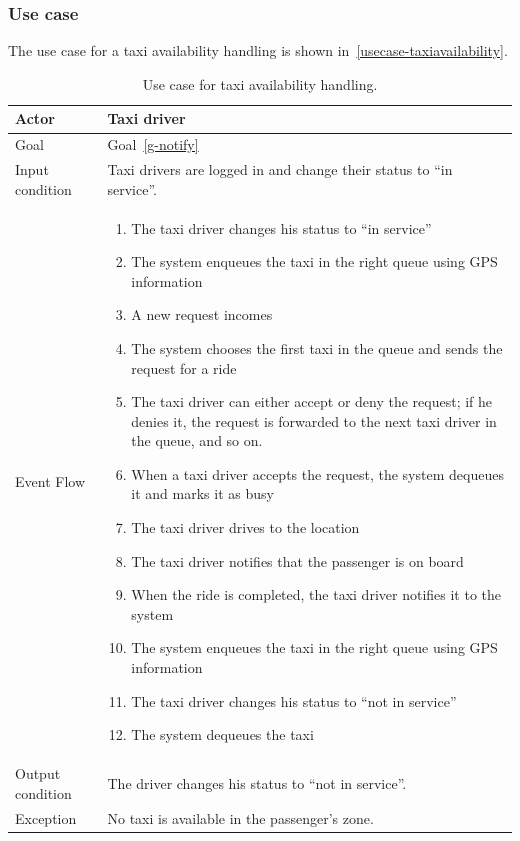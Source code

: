 \subsubsection{Use case}
The use case for a taxi availability handling is shown in~\autoref{usecase-taxiavailability}.

\begin{table}
\begin{center}
\begin{tabular}{| l | p{} |}
\hline
Actor & Taxi driver \\
\hline
Goal & Goal~\ref{g-notify}
\\
\hline
Input condition & Taxi drivers are logged in and change their status to ``in service''.  \\
\hline
Event Flow & \begin{enumerate}
	\item The taxi driver changes his status to ``in service''
	\item The system enqueues the taxi in the right queue using GPS information
	\item A new request incomes
	\item The system chooses the first taxi in the queue and sends the request for a ride
	\item The taxi driver can either accept or deny the request; if he denies it, the request is forwarded to the next taxi driver in the queue, and so on.
	\item When a taxi driver accepts the request, the system dequeues it and marks it as busy
	\item The taxi driver drives to the location
	\item The taxi driver notifies that the passenger is on board
	\item When the ride is completed, the taxi driver notifies it to the system
	\item The system enqueues the taxi in the right queue using GPS information
	\item The taxi driver changes his status to ``not in service''
	\item The system dequeues the taxi
\end{enumerate}
\\
\hline
Output condition & The driver changes his status to ``not in service''. \\
\hline
Exception & No taxi is available in the passenger's zone. \\
\hline
\end{tabular}
\end{center}
\caption{Use case for taxi availability handling.}
\label{usecase-taxiavailability}
\end{table}


